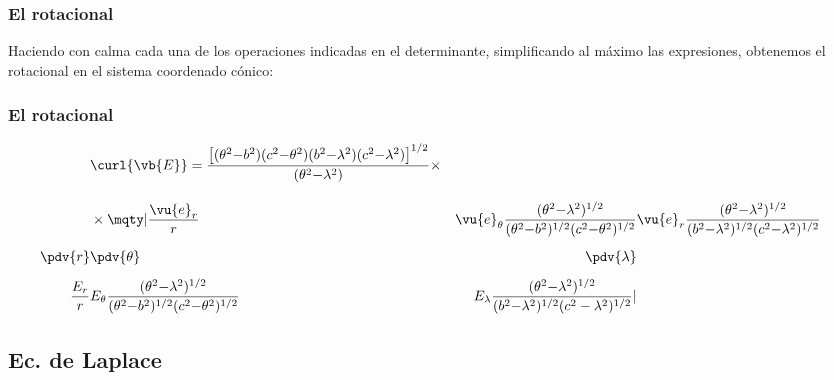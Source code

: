 \begin{frame}
\frametitle{El rotacional}
Haciendo con calma cada una de los operaciones indicadas en el determinante, simplificando al máximo las expresiones, obtenemos el rotacional en el sistema coordenado cónico:
\end{frame}
\begin{frame}
\frametitle{El rotacional}
\fontsize{12}{12}\selectfont
\begin{align*}
&\curl{\vb{E}} = \dfrac{\big[ (\theta^{2} {-} b^{2}) (c^{2} {-} \theta^{2}) (b^{2} {-} \lambda^{2}) (c^{2} {-} \lambda^{2}) \big]^{1/2}}{(\theta^{2} {-} \lambda^{2})} \times \\[1em]
&\times \mqty| \dfrac{\vu{e}_{r}}{r} & \vu{e}_{\theta} \dfrac{(\theta^{2} {-} \lambda^{2})^{1/2}}{(\theta^{2} {-} b^{2})^{1/2} (c^{2} {-} \theta^{2})^{1/2}} & \vu{e}_{r} \dfrac{(\theta^{2} {-} \lambda^{2})^{1/2}}{(b^{2} {-} \lambda^{2})^{1/2} (c^{2} {-} \lambda^{2})^{1/2}} \\[0.5em]
\displaystyle \pdv{r} & \displaystyle \pdv{\theta} & \displaystyle \pdv{\lambda} \\[0.5em]
\dfrac{E_{r}}{r} & E_{\theta} \dfrac{(\theta^{2} {-} \lambda^{2})^{1/2}}{(\theta^{2} {-} b^{2})^{1/2} (c^{2} {-} \theta^{2})^{1/2}} & E_{\lambda} \dfrac{(\theta^{2} {-} \lambda^{2})^{1/2}}{(b^{2} {-} \lambda^{2})^{1/2} (c^{2} - \lambda^{2})^{1/2}}
|
\end{align*}
\end{frame}

\subsection{Ec. de Laplace}

